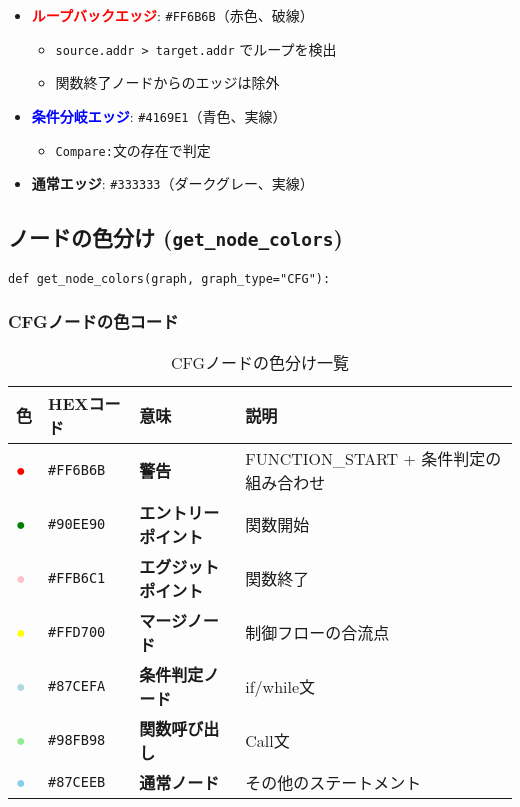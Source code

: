 \documentclass[a4paper,12pt]{article}
\begin{document}
\begin{itemize}
    \item \textcolor{red}{\textbf{ループバックエッジ}}: \texttt{\#FF6B6B}（赤色、破線）
    \begin{itemize}
        \item \texttt{source.addr > target.addr} でループを検出
        \item 関数終了ノードからのエッジは除外
    \end{itemize}
    \item \textcolor{blue}{\textbf{条件分岐エッジ}}: \texttt{\#4169E1}（青色、実線）
    \begin{itemize}
        \item \texttt{Compare:}文の存在で判定
    \end{itemize}
    \item \textbf{通常エッジ}: \texttt{\#333333}（ダークグレー、実線）
\end{itemize}

\subsection{ノードの色分け (\texttt{get\_node\_colors})}

\begin{lstlisting}[caption=ノード色分け関数]
def get_node_colors(graph, graph_type="CFG"):
\end{lstlisting}

\subsubsection{CFGノードの色コード}

\begin{table}[h]
\centering
\begin{tabular}{@{}llll@{}}
\toprule
\textbf{色} & \textbf{HEXコード} & \textbf{意味} & \textbf{説明} \\
\midrule
\textcolor{red}{●} & \texttt{\#FF6B6B} & \textbf{警告} & FUNCTION\_START + 条件判定の組み合わせ \\
\textcolor{green}{●} & \texttt{\#90EE90} & \textbf{エントリーポイント} & 関数開始 \\
\textcolor{pink}{●} & \texttt{\#FFB6C1} & \textbf{エグジットポイント} & 関数終了 \\
\textcolor{yellow}{●} & \texttt{\#FFD700} & \textbf{マージノード} & 制御フローの合流点 \\
\textcolor{lightblue}{●} & \texttt{\#87CEFA} & \textbf{条件判定ノード} & if/while文 \\
\textcolor{lightgreen}{●} & \texttt{\#98FB98} & \textbf{関数呼び出し} & Call文 \\
\textcolor{skyblue}{●} & \texttt{\#87CEEB} & \textbf{通常ノード} & その他のステートメント \\
\bottomrule
\end{tabular}
\caption{CFGノードの色分け一覧}
\label{tab:node_colors}
\end{table}
\end{document}
